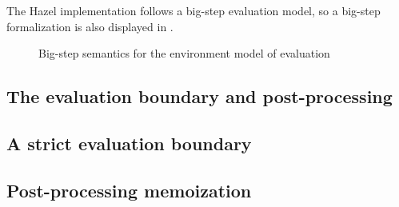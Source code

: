 The Hazel implementation follows a big-step evaluation model, so a big-step formalization is also displayed in .

\begin{figure}
  \centering
  \begin{mdframed}
    \begin{singlespace}
      
    \end{singlespace}
  \end{mdframed}
  \caption{Big-step semantics for the environment model of evaluation}
  \label{fig:big-step-formal}
\end{figure}




\subsection{The evaluation boundary and post-processing}
\label{sec:closures_to_lambdas}


\subsection{A strict evaluation boundary}
\label{sec:strict_eval_boundary}

\subsection{Post-processing memoization}
\label{sec:memoization}

